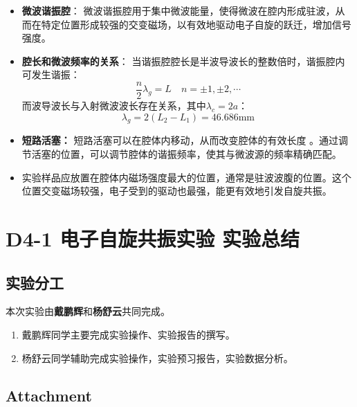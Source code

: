 \documentclass[dvipsnames, svgnames,a4paper,11pt]{article}
\begin{document}
	\begin{itemize}
		\item \textbf{微波谐振腔}：
			微波谐振腔用于集中微波能量，使得微波在腔内形成驻波，从而在特定位置形成较强的交变磁场，以有效地驱动电子自旋的跃迁，增加信号强度。
		\item \textbf{腔长和微波频率的关系}：
			当谐振腔腔长是半波导波长的整数倍时，谐振腔内可发生谐振：
			\[
				\frac{n}{2} \lambda_g = L \quad n = \pm 1, \pm 2, \cdots
			\]
			而波导波长与入射微波波长存在关系，其中$\lambda_c = 2a$：
			\[
				\lambda_g = 2 (L_2 - L_1) = 46.686 \mathrm{mm}
			\]

		\item \textbf{短路活塞：}
			短路活塞可以在腔体内移动，从而改变腔体的有效长度 。通过调节活塞的位置，可以调节腔体的谐振频率，使其与微波源的频率精确匹配。

		\item 实验样品应放置在腔体内磁场强度最大的位置，通常是驻波波腹的位置。这个位置交变磁场较强，电子受到的驱动也最强，能更有效地引发自旋共振。
	\end{itemize}












\clearpage
\section{D4-1 \quad 电子自旋共振实验 \quad\heiti 实验总结}

	\subsection{实验分工}

		本次实验由\textbf{戴鹏辉}和\textbf{杨舒云}共同完成。
		\begin{enumerate}
			\item 戴鹏辉同学主要完成实验操作、实验报告的撰写。
			\item 杨舒云同学辅助完成实验操作，实验预习报告，实验数据分析。
		\end{enumerate}


	\subsection{Attachment}
\end{document}
